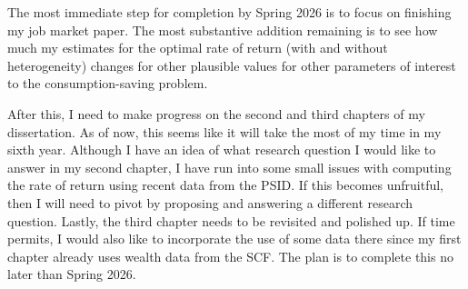 \documentclass[\econtexRoot/Chp1proposal]{subfiles}
\begin{document}
The most immediate step for completion by Spring 2026 is to focus on finishing my job market paper. The most substantive addition remaining is to see how much my estimates for the optimal rate of return (with and without heterogeneity) changes for other plausible values for other parameters of interest to the consumption-saving problem.

\par After this, I need to make progress on the second and third chapters of my dissertation. As of now, this seems like it will take the most of my time in my sixth year. Although I have an idea of what research question I would like to answer in my second chapter, I have run into some small issues with computing the rate of return using recent data from the PSID. If this becomes unfruitful, then I will need to pivot by proposing and answering a different research question. Lastly, the third chapter needs to be revisited and polished up. If time permits, I would also like to incorporate the use of some data there since my first chapter already uses wealth data from the SCF. The plan is to complete this no later than Spring 2026.



\onlyinsubfile{}

\end{document}
